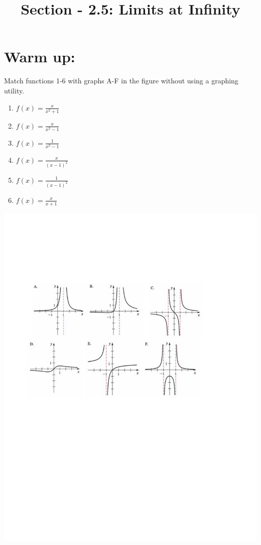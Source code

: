 \documentclass[handout,nooutcomes]{ximera}
\title{Section - 2.5:  Limits at Infinity}
\begin{document}
\begin{abstract}		\end{abstract}
\maketitle

\section*{Warm up:}  
Match functions 1-6 with graphs A-F in the figure without using a graphing utility.
	\begin{enumerate}[label=\arabic*.]
	\item $f(x) = \frac{x}{x^2 + 1}$  
	\item $f(x) = \frac{x}{x^2 -1}$
	\item $f(x) = \frac{1}{x^2 -1}$
	\item $f(x) = \frac{x}{(x-1)^2}$
	\item $f(x) = \frac{1}{(x-1)^2}$
	\item $f(x) = \frac{x}{x+1}$
	\end{enumerate}
	
	\begin{image}
	\includegraphics[trim= 250 360 300 185]{Figure1.pdf}
	\end{image}
\end{document}
